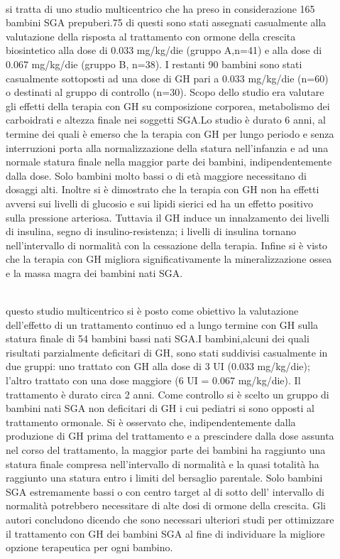 \begin{description}
\item[{\parbox[t]{18cm}{\citet{hokken2003final}}}]
\hfill \\
si tratta di uno studio multicentrico che ha preso in considerazione 165 bambini SGA prepuberi.75 di questi sono stati assegnati casualmente alla valutazione della risposta al trattamento con ormone della crescita biosintetico alla dose di 0.033 mg/kg/die (gruppo A,n=41) e alla dose di 0.067 mg/kg/die (gruppo B, n=38). I restanti 90 bambini sono stati casualmente sottoposti ad una dose di GH pari a 0.033 mg/kg/die (n=60) o destinati al gruppo di controllo (n=30). Scopo dello studio era valutare gli effetti della terapia con GH su composizione corporea, metabolismo dei carboidrati e altezza finale nei soggetti SGA.Lo studio è durato 6 anni, al termine dei quali è emerso che la terapia con GH per lungo periodo e senza interruzioni porta alla normalizzazione della statura nell'infanzia e ad una normale statura finale nella maggior parte dei bambini, indipendentemente dalla dose. Solo bambini molto bassi o di età maggiore necessitano di dosaggi alti. Inoltre si è dimostrato che la terapia con GH non ha effetti avversi sui livelli di glucosio e sui lipidi sierici ed ha un effetto positivo sulla pressione arteriosa. Tuttavia il GH induce un innalzamento dei livelli  di insulina, segno di insulino-resistenza; i livelli di insulina tornano nell'intervallo di normalità con la cessazione della terapia. Infine si è visto che la terapia con GH migliora significativamente la mineralizzazione ossea e la massa magra dei bambini nati SGA. 

\item[{\parbox[t]{18cm}{Yvonne Van Pareren et al,\\The journal of clinical endocrinology \& metabolism 2003}}] \hfill \\
 questo studio multicentrico si è posto come obiettivo la valutazione dell'effetto di un trattamento continuo ed a lungo termine con GH sulla statura finale di 54 bambini bassi nati SGA.I bambini,alcuni dei quali risultati parzialmente  deficitari di GH, sono stati suddivisi casualmente in due gruppi: uno trattato con GH alla dose di 3 UI (0.033 mg/kg/die); l'altro trattato con una dose maggiore (6 UI = 0.067 mg/kg/die). Il trattamento è durato circa 2 anni. Come controllo si è scelto un gruppo di bambini nati SGA non deficitari di GH i cui pediatri si sono opposti al trattamento ormonale. Si è osservato che, indipendentemente dalla produzione di GH prima del trattamento e a prescindere dalla dose assunta nel corso del trattamento, la maggior parte dei bambini ha raggiunto una statura finale compresa nell'intervallo di normalità e la quasi totalità ha raggiunto una statura entro i limiti del bersaglio parentale. Solo bambini SGA estremamente bassi o con centro target al di sotto dell' intervallo di normalità potrebbero necessitare di alte dosi di ormone della crescita. Gli autori concludono dicendo che sono necessari ulteriori studi per ottimizzare il trattamento con GH dei bambini SGA al fine di individuare la migliore opzione terapeutica per ogni bambino. 


\end{description}
